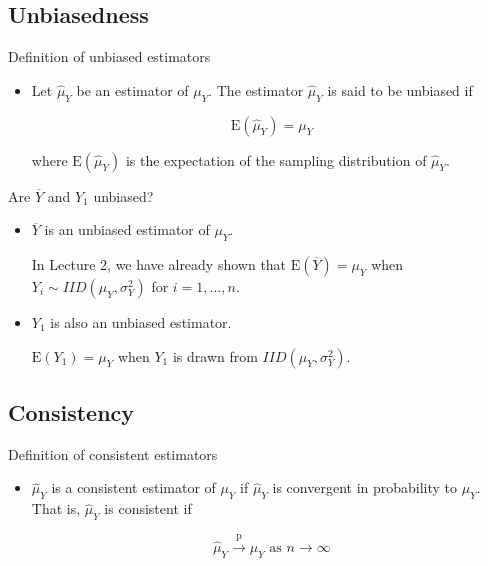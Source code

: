 \documentclass[presentation]{beamer}
\begin{document}
\subsection*{Unbiasedness}
\label{sec:org5dd8e1e}

\begin{frame}[label={sec:orgf76d8ca}]{Definition of unbiased estimators}
\begin{itemize}
\item Let \(\hat{\mu}_Y\) be an estimator of \(\mu_Y\). The estimator
\(\hat{\mu}_Y\) is said to be unbiased if 

\[\mathrm{E}(\hat{\mu}_Y) = \mu_Y\]

where \(\mathrm{E}(\hat{\mu}_Y)\) is the expectation of the
sampling distribution of \(\hat{\mu}_Y\).
\end{itemize}
\end{frame}

\begin{frame}[label={sec:org6f62b91}]{Are \(\overline{Y}\) and \(Y_1\) unbiased?}
\begin{itemize}
\item \(\overline{Y}\) is an unbiased estimator of \(\mu_Y\). 

\vspace{0.3cm}

In Lecture 2, we have already shown that \(\mathrm{E}(\overline{Y}) =
  \mu_Y\) when \(Y_i \sim IID(\mu_Y, \sigma^2_Y)\) for \(i=1, \ldots, n\).

\vspace{0.3cm}

\item \(Y_1\) is also an unbiased estimator. 

\(\mathrm{E}(Y_1) = \mu_Y\) when \(Y_1\) is drawn from \(IID(\mu_Y,
  \sigma^2_Y)\).
\end{itemize}
\end{frame}

\subsection*{Consistency}
\label{sec:orgd175543}

\begin{frame}[label={sec:orgf110a06}]{Definition of consistent estimators}
\begin{itemize}
\item \(\hat \mu_Y\) is a consistent estimator of \(\mu_Y\) if \(\hat{\mu}_Y\)
is convergent in probability to \(\mu_Y\). That is, \(\hat{\mu}_Y\) is
consistent if 

\[\hat{\mu}_Y \xrightarrow{\text{ p }} \mu_Y \text{ as
  } n \rightarrow \infty\]
\end{itemize}
\end{frame}
\end{document}

